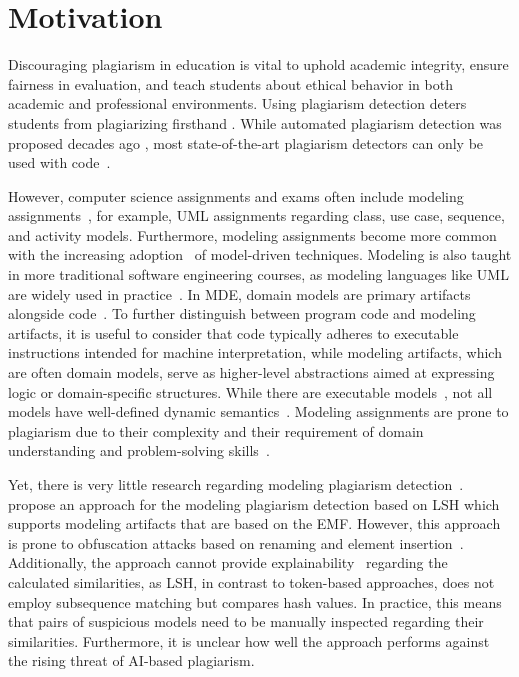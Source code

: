 \section{Motivation}\label{sec:mde-motivation}

Discouraging plagiarism in education is vital to uphold academic integrity, ensure fairness in evaluation, and teach students about ethical behavior in both academic and professional environments. Using plagiarism detection deters students from plagiarizing firsthand \cite{Braumoeller2001}.
While automated plagiarism detection was proposed decades ago \cite{Ottenstein1976, prechelt2000, Novak2019}, most state-of-the-art plagiarism detectors can only be used with code~\cite{MOSS, prechelt2000, prechelt2002, Maertens2022, Novak2020}.

However, computer science assignments and exams often include modeling assignments~\cite{Ciccozzi2018, Stahl2006, Saglam2023}, for example, \ac{UML} assignments regarding class, use case, sequence, and activity models.
Furthermore, modeling assignments become more common with the increasing adoption~\cite{Brambilla2017, Hutchinson2011} of model-driven techniques. %
Modeling is also taught in more traditional software engineering courses, as modeling languages like \ac{UML} are widely used in practice~\cite{Engels2006}.
In \ac{MDE}, domain models are primary artifacts alongside code~\cite{Kent2002}.
To further distinguish between program code and modeling artifacts, it is useful to consider that code typically adheres to executable instructions intended for machine interpretation, while modeling artifacts, which are often domain models, serve as higher-level abstractions aimed at expressing logic or domain-specific structures. While there are executable models~\cite{Seidewitz2014, Fuksa2024}, not all models have well-defined dynamic semantics~\cite{Stahl2006}.
Modeling assignments are prone to plagiarism due to their complexity and their requirement of domain understanding and problem-solving skills~\cite{Martinez2020}.

Yet, there is very little research regarding modeling plagiarism detection~\cite{Saglam2022, Saglam2023}.
\citet{Martinez2020} propose an approach for the modeling plagiarism detection based on \ac{LSH} which supports modeling artifacts that are based on the \ac{EMF}.
However, this approach is prone to obfuscation attacks based on renaming and element insertion~\cite{Saglam2022}.
Additionally, the approach cannot provide explainability~\cite{Karnalim2021} regarding the calculated similarities, as \ac{LSH}, in contrast to token-based approaches, does not employ subsequence matching but compares hash values. In practice, this means that pairs of suspicious models need to be manually inspected regarding their similarities.
Furthermore, it is unclear how well the approach performs against the rising threat of AI-based plagiarism.


